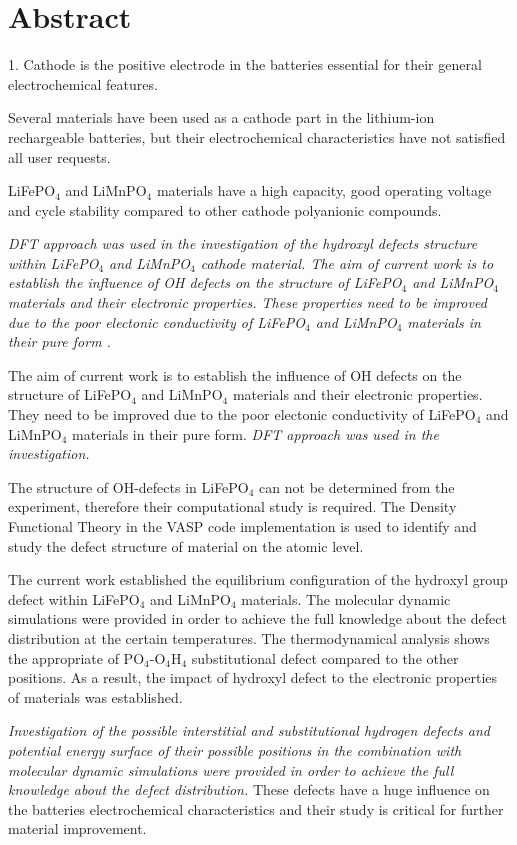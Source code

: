 \section{Abstract}
1. Cathode is the positive electrode in the batteries essential for their general electrochemical features.

Several materials have been used as a cathode part in the lithium-ion rechargeable batteries, but their electrochemical characteristics have not satisfied all user requests. 

LiFePO$_4$ and LiMnPO$_4$ materials have a high capacity, good operating voltage and cycle stability compared to other cathode polyanionic compounds.

\textit{DFT approach was used in the investigation of the hydroxyl defects structure within LiFePO$_4$ and LiMnPO$_4$ cathode material. The aim of current work is to establish the influence of OH defects on the structure of LiFePO$_4$ and LiMnPO$_4$ materials and their electronic properties. These properties need to be improved due to the poor electonic conductivity of LiFePO$_4$ and LiMnPO$_4$ materials in their pure form .}

The aim of current work is to establish the influence of OH defects on the structure of LiFePO$_4$ and LiMnPO$_4$ materials and their electronic properties. They need to be improved due to the poor electonic conductivity of LiFePO$_4$ and LiMnPO$_4$ materials in their pure form. \textit{DFT approach was used in the investigation. }

The structure of OH-defects in LiFePO$_4$ can not be determined from the experiment, therefore their computational study is required. The Density Functional Theory in the VASP code implementation is used to identify and study the defect structure of material on the atomic level. 

The current work established the equilibrium configuration of the hydroxyl group defect within LiFePO$_4$ and LiMnPO$_4$ materials. The molecular dynamic simulations were provided in order to achieve the full knowledge about the defect distribution at the certain temperatures. The thermodynamical analysis shows the appropriate of PO$_4$-O$_4$H$_4$ substitutional defect compared to the other positions. As a result, the impact of hydroxyl defect to the electronic properties of materials was established.

\textit{Investigation of the possible interstitial and substitutional hydrogen defects and potential energy surface of their possible positions in the combination with molecular dynamic simulations were provided in order to achieve the full knowledge about the defect distribution.} These defects have a huge influence on the batteries electrochemical characteristics and their study is critical for further material improvement. 

